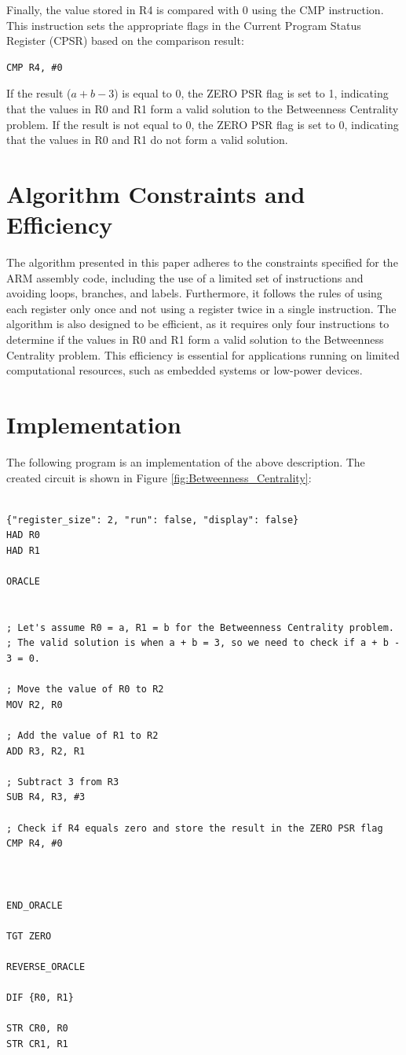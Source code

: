 Finally, the value stored in R4 is compared with 0 using the CMP instruction. This instruction sets the appropriate flags in the Current Program Status Register (CPSR) based on the comparison result:

\begin{verbatim}
CMP R4, #0
\end{verbatim}

If the result ($a + b - 3$) is equal to 0, the ZERO PSR flag is set to 1, indicating that the values in R0 and R1 form a valid solution to the Betweenness Centrality problem. If the result is not equal to 0, the ZERO PSR flag is set to 0, indicating that the values in R0 and R1 do not form a valid solution.

\section{Algorithm Constraints and Efficiency}

The algorithm presented in this paper adheres to the constraints specified for the ARM assembly code, including the use of a limited set of instructions and avoiding loops, branches, and labels. Furthermore, it follows the rules of using each register only once and not using a register twice in a single instruction. The algorithm is also designed to be efficient, as it requires only four instructions to determine if the values in R0 and R1 form a valid solution to the Betweenness Centrality problem. This efficiency is essential for applications running on limited computational resources, such as embedded systems or low-power devices.



\section{Implementation}

The following program is an implementation of the above description. The created circuit is shown in Figure \ref{fig:Betweenness_Centrality}:

\begin{lstlisting}

{"register_size": 2, "run": false, "display": false}
HAD R0
HAD R1

ORACLE


; Let's assume R0 = a, R1 = b for the Betweenness Centrality problem.
; The valid solution is when a + b = 3, so we need to check if a + b - 3 = 0.

; Move the value of R0 to R2
MOV R2, R0

; Add the value of R1 to R2
ADD R3, R2, R1

; Subtract 3 from R3
SUB R4, R3, #3

; Check if R4 equals zero and store the result in the ZERO PSR flag
CMP R4, #0



END_ORACLE

TGT ZERO

REVERSE_ORACLE

DIF {R0, R1}

STR CR0, R0
STR CR1, R1


\end{lstlisting}

